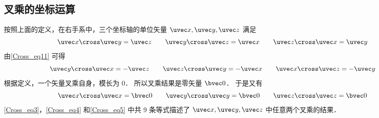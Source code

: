 \subsection{叉乘的坐标运算}

按照上面的定义，在右手系中，三个坐标轴的单位矢量 $\uvec x, \uvec y, \uvec z$ 满足
\begin{equation}\label{Cross_eq3}
\uvec x \cross \uvec y = \uvec z
\qquad
\uvec y \cross \uvec z = \uvec x
\qquad
\uvec z \cross \uvec x = \uvec y
\end{equation}
由\autoref{Cross_eq11} 可得
\begin{equation}\label{Cross_eq4}
\uvec y \cross \uvec x =  - \uvec z
\qquad
\uvec z \cross \uvec y =  - \uvec x
\qquad
\uvec x \cross \uvec z =  - \uvec y
\end{equation}
根据定义，一个矢量叉乘自身，模长为 $0$． 所以叉乘结果是零矢量 $\bvec 0$． 于是又有
\begin{equation}\label{Cross_eq5}
\uvec x \cross \uvec x = \bvec 0
\qquad
\uvec y \cross \uvec y = \bvec 0
\qquad
\uvec z \cross \uvec z = \bvec 0
\end{equation}
\autoref{Cross_eq3}，\autoref{Cross_eq4} 和\autoref{Cross_eq5} 中共 9 条等式描述了 $\uvec x, \uvec y, \uvec z$ 中任意两个叉乘的结果．




